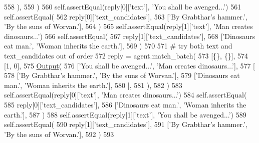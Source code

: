\begin{DoxyCode}
558             ),
559         )
560         self.assertEqual(reply[0][\textcolor{stringliteral}{'text'}], \textcolor{stringliteral}{'You shall be avenged...'})
561         self.assertEqual(
562             reply[0][\textcolor{stringliteral}{'text\_candidates'}],
563             [\textcolor{stringliteral}{'By Grabthar’s hammer.'}, \textcolor{stringliteral}{'By the suns of Worvan.'}],
564         )
565         self.assertEqual(reply[1][\textcolor{stringliteral}{'text'}], \textcolor{stringliteral}{'Man creates dinosaurs...'})
566         self.assertEqual(
567             reply[1][\textcolor{stringliteral}{'text\_candidates'}],
568             [\textcolor{stringliteral}{'Dinosaurs eat man.'}, \textcolor{stringliteral}{'Woman inherits the earth.'}],
569         )
570 
571         \textcolor{comment}{# try both text and text\_candidates out of order}
572         reply = agent.match\_batch(
573             [\{\}, \{\}],
574             [1, 0],
575             \hyperlink{namespaceparlai_1_1agents_1_1legacy__agents_1_1seq2seq_1_1torch__agent__v1_a2689006ea97d09413fb242f984bd8016}{Output}(
576                 [\textcolor{stringliteral}{'You shall be avenged...'}, \textcolor{stringliteral}{'Man creates dinosaurs...'}],
577                 [
578                     [\textcolor{stringliteral}{'By Grabthar’s hammer.'}, \textcolor{stringliteral}{'By the suns of Worvan.'}],
579                     [\textcolor{stringliteral}{'Dinosaurs eat man.'}, \textcolor{stringliteral}{'Woman inherits the earth.'}],
580                 ],
581             ),
582         )
583         self.assertEqual(reply[0][\textcolor{stringliteral}{'text'}], \textcolor{stringliteral}{'Man creates dinosaurs...'})
584         self.assertEqual(
585             reply[0][\textcolor{stringliteral}{'text\_candidates'}],
586             [\textcolor{stringliteral}{'Dinosaurs eat man.'}, \textcolor{stringliteral}{'Woman inherits the earth.'}],
587         )
588         self.assertEqual(reply[1][\textcolor{stringliteral}{'text'}], \textcolor{stringliteral}{'You shall be avenged...'})
589         self.assertEqual(
590             reply[1][\textcolor{stringliteral}{'text\_candidates'}],
591             [\textcolor{stringliteral}{'By Grabthar’s hammer.'}, \textcolor{stringliteral}{'By the suns of Worvan.'}],
592         )
593 
\end{DoxyCode}
\mbox{\label{classtests_1_1test__torch__agent_1_1TestTorchAgent_a0a7c1df7d947bdc260afa6dad21d78b9}} 
